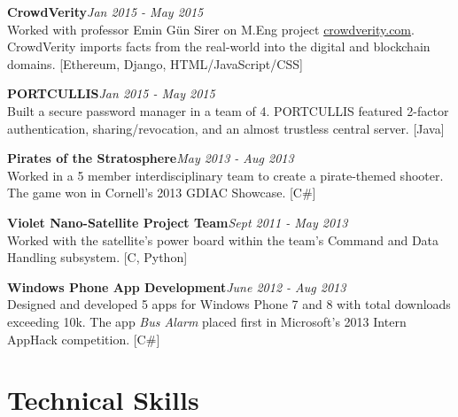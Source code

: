 \documentclass[11pt,letterpaper,sans]{moderncv}
\newenvironment{pzentry}[3]
{\textbf{#1}\notblank{#2}{\textit{~- #2}}{}\hfill\textit{#3}\\\normalsize}
{\bigskip}
\begin{document}
\begin{pzentry}{CrowdVerity}{}{Jan 2015 - May 2015}
Worked with professor Emin G\"{u}n Sirer on M.Eng project \href{http://crowdverity.com/}{crowdverity.com}.
CrowdVerity imports facts from the real-world into the digital and blockchain domains.
[Ethereum, Django, HTML/JavaScript/CSS]
\end{pzentry}

\begin{pzentry}{PORTCULLIS}{}{Jan 2015 - May 2015}
Built a secure password manager in a team of 4.
PORTCULLIS featured 2-factor authentication, sharing/revocation, and an almost trustless central server.
[Java]
\end{pzentry}

\begin{pzentry}{Pirates of the Stratosphere}{}{May 2013 - Aug 2013}
Worked in a 5 member interdisciplinary team to create a pirate-themed shooter.
The game won in Cornell's 2013 GDIAC Showcase.
[C\#]
\end{pzentry}


\begin{pzentry}{Violet Nano-Satellite Project Team}{}{Sept 2011 - May 2013}
Worked with the satellite's power board within the team's Command and Data Handling subsystem.
[C, Python]
\end{pzentry}

\begin{pzentry}{Windows Phone App Development}{}{June 2012 - Aug 2013}
Designed and developed 5 apps for Windows Phone 7 and 8 with total downloads exceeding 10k.
The app \emph{Bus Alarm} placed first in Microsoft's 2013 Intern AppHack competition.
[C\#]
\end{pzentry}




\section{Technical Skills} %

\medskip
{}
\end{document}
